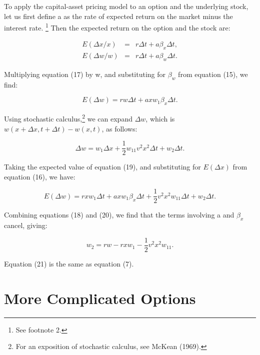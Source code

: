 \documentclass[a4paper, 12pt, twoside]{article}
\begin{document}
To apply the capital-asset pricing model to an option and the underlying stock, let us 
first define a as the rate of expected return on the market minus the interest rate.
\footnote{\linespread{1}\fontsize{10}{10}\selectfont
See footnote 2.
}
Then the expected return on the option and the stock are:

\begin{eqnarray}
E(\Delta x/x)&=&r\Delta t+a\beta_x \Delta t, \\
E(\Delta w/w)&=&r\Delta t+a\beta_w \Delta t. 
\end{eqnarray}

\vspace*{3mm}
\noindent Multiplying equation (17) by w, and substituting for $\beta_w$ from equation (15), we find:

\begin{equation}
E(\Delta w)=rw\Delta t+axw_1 \beta_x \Delta t.      
\end{equation}

Using stochastic calculus,\footnote{\linespread{1}\fontsize{10}{10}\selectfont
For an exposition of stochastic calculus, see McKean (1969).
}
we can expand $\Delta w$, which is $w(x+\Delta x,t+\Delta t)-w(x,t)$, as follows:

\begin{equation}
\Delta w=w_1 \Delta x+ \frac{1}{2} w_{11} v^2 x^2 \Delta t+w_2 \Delta t.
\end{equation}

\noindent Taking the expected value of equation (19), and substituting for $E(\Delta x)$ from equation 
(16), we have:

\begin{equation}
E(\Delta w)=rxw_1 \Delta t+axw_1 \beta_x \Delta t+ \frac{1}{2} v^2 x^2 w_{11} \Delta t+w_2 \Delta t.
\end{equation}

\noindent Combining equations (18) and (20), we find that the terms involving a and $\beta_x$ cancel, 
giving:

\begin{equation}
w_2=rw-rxw_1-\frac{1}{2} v^2 x^2 w_{11}. 
\end{equation}

\noindent Equation (21) is the same as equation (7).

\section*{More Complicated Options}
\end{document}
